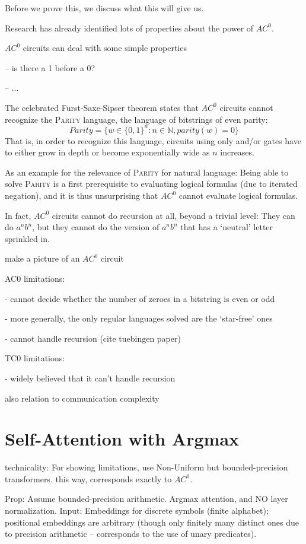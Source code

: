 \documentclass[11pt,a4paper]{article}
\newcounter{theorem}
\begin{document}
Before we prove this, we discuss what this will give us.

Research has already identified lots of properties about the power of $AC^0$.

$AC^0$ circuits can deal with some simple properties

-- is there a 1 before a 0?

-- ...



The celebrated Furst-Saxe-Sipser theorem states that $AC^0$ circuits cannot recognize the \textsc{Parity} language, the language of bitstrings of even parity:
$$Parity = \{w \in \{0,1\}^n : n \in \mathbb{N}, parity(w) = 0\}$$
That is, in order to recognize this language, circuits using only and/or gates have to either grow in depth or become exponentially wide as $n$ increases.

As an example for the relevance of \textsc{Parity} for natural language:
Being able to solve \textsc{Parity} is a first prerequisite to evaluating logical formulas (due to iterated negation), and it is thus unsurprising that $AC^0$ cannot evaluate logical formulas.

In fact, $AC^0$ circuits cannot do recursion at all, beyond a trivial level:
They can do $a^nb^n$, but they cannot do the version of $a^nb^n$ that has a `neutral' letter sprinkled in.


make a picture of an $AC^0$ circuit



AC0 limitations:

- cannot decide whether the number of zeroes in a bitstring is even or odd

- more generally, the only regular languages solved are the `star-free' ones

- cannot handle recursion (cite tuebingen paper)

TC0 limitations:

- widely believed that it can't handle recursion

also relation to communication complexity

\section{Self-Attention with Argmax}

technicality:
For showing limitations, use Non-Uniform but bounded-precision transformers. this way, corresponds exactly to $AC^0$.

Prop:
Assume bounded-precision arithmetic. Argmax attention, and NO layer normalization.
Input: Embeddings for discrete symbols (finite alphabet); positional embeddings are arbitrary (though only finitely many distinct ones due to precision arithmetic -- corresponds to the use of unary predicates).
\end{document}
